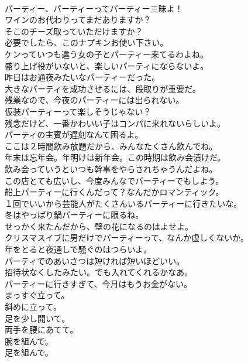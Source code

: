 \documentclass[8pt]{extreport}
\begin{document}
\begin{CJK}{UTF8}{min}
\\	パーティー、パーティーってパーティー三昧よ！	
\\	ワインのお代わりってまだありますか？	
\\	そこのチーズ取っていただけますか？	
\\	必要でしたら、このナプキンお使い下さい。	
\\	ケンっていつも違う女の子とパーティー来てるわよね。	
\\	盛り上げ役がいないと、楽しいパーティにならないよ。	
\\	昨日はお通夜みたいなパーティーだった。	
\\	大きなパーティを成功させるには、段取りが重要だ。	
\\	残業なので、今夜のパーティーには出られない。	
\\	仮装パーティーって楽しそうじゃない？	
\\	残念だけど、一番かわいい子はコンパに来れないらしいよ。	
\\	パーティの主賓が遅刻なんて困るよ。	
\\	ここは２時間飲み放題だから、みんなたくさん飲んでね。	
\\	年末は忘年会。年明けは新年会。この時期は飲み会漬けだ。	
\\	飲み会っていうといつも幹事をやらされちゃうんだよね。	
\\	この店とても広いし、今度みんなでパーティーでもしよう。	
\\	船上パーティーに行くんだって？なんだかロマンティック。	
\\	１回でいいから芸能人がたくさんいるパーティーに行きたいな。	
\\	冬はやっぱり鍋パーティーに限るね。	
\\	せっかく来たんだから、壁の花になるのはよせよ。	
\\	クリスマスイブに男だけでパーティーって、なんか虚しくないか。	
\\	年をとると夜通しで騒ぐのはつらいよ。	
\\	パーティでのあいさつは短ければ短いほどいい。	
\\	招待状なくしたみたい。でも入れてくれるかなあ。	
\\	パーティーに行きすぎて、今月はもうお金がない。	
\\	まっすぐ立って。	
\\	斜めに立って。	
\\	足を少し開いて。	
\\	両手を腰にあてて。	
\\	腕を組んで。	
\\	足を組んで。	

\end{CJK}
\end{document}

